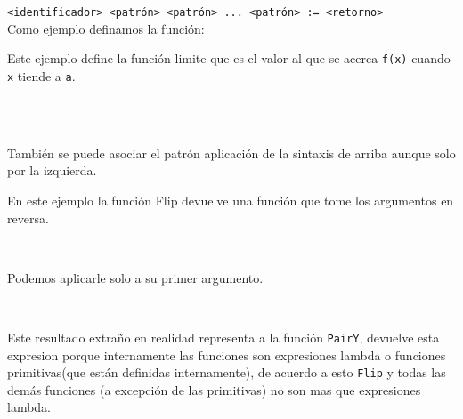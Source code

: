       \texttt{<identificador>~<patrón>~<patrón>~...~<patrón>~:=~<retorno>}
      \\
      
      Como ejemplo definamos la función:
      
      \begin{fxcode}
      \end{fxcode}
      
      Este ejemplo define la función limite que es el valor al que se acerca \texttt{f(x)} cuando \texttt{x} tiende a \texttt{a}.
      
      \begin{fxcode}
         \\
         \\
      \end{fxcode}
      
      También se puede asociar el patrón aplicación de la sintaxis de arriba aunque solo por la izquierda.
      
      \begin{fxcode}
      \end{fxcode}
      
      En este ejemplo la función Flip devuelve una función que tome los argumentos en reversa.
      
      \begin{fxcode}
         \\
      \end{fxcode}
      
      Podemos aplicarle solo a su primer argumento.
      
      \begin{fxcode}
         \\
      \end{fxcode}
      
      Este resultado extraño en realidad representa a la función \texttt{PairY}, devuelve esta expresion porque internamente las funciones son expresiones lambda o funciones primitivas(que están definidas internamente), de acuerdo a esto \texttt{Flip} y todas las demás funciones (a excepción de las primitivas) no son mas que expresiones lambda.
      
